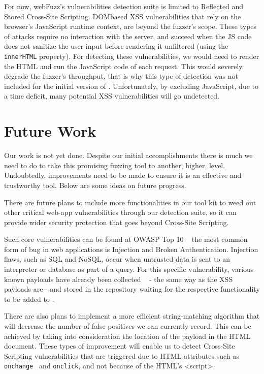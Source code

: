 For now, webFuzz's vulnerabilities detection suite is limited to Reflected and Stored Cross-Site Scripting. DOMbased XSS vulnerabilities that rely on the browser's JavaScript runtime context, are beyond the fuzzer's scope. These types of attacks require no interaction with
the server, and succeed when the JS code does not sanitize the user input before rendering it unfiltered (\eg using the {\tt innerHTML} property). For detecting these vulnerabilities, we would need to render the HTML and run the JavaScript code of each request. This would severely degrade the fuzzer's throughput, that is why this type of detection was not included for the initial version of \pname{}.  Unfortunately, by excluding JavaScript, due to a time deficit, many potential XSS vulnerabilities will go undetected.

\section{Future Work}
Our work is not yet done. Despite our initial accomplishments there is much we need to do to take this promising fuzzing tool to another, higher, level. Undoubtedly, improvements need to be made to ensure it is an effective and trustworthy tool. Below are some ideas on future progress.

There are future plans to include more functionalities in our tool kit to weed out other critical web-app vulnerabilities through our detection suite, so it can provide wider security protection that goes beyond Cross-Site Scripting. 

Such core vulnerabilities can be found at OWASP Top 10 ~\cite{owasp2017} the most common form of bug in web applications is Injection and Broken Authentication. Injection flaws, such as SQL and NoSQL, occur when untrusted data is sent to an interpreter or database as part of a query. For this specific vulnerability, various known payloads have already been collected ~\cite{seclist} - the same way as the XSS payloads are - and stored in the repository waiting for the respective functionality to be added to \pname{}.

There are also plans to implement a more efficient string-matching algorithm that will decrease the number of false positives we can currently record. This can be achieved by taking into consideration the location of the payload in the HTML document. These types of improvement will enable us to detect Cross-Site Scripting vulnerabilities that are triggered due to HTML attributes such as {\tt onchange } and {\tt onclick}, and not because of the HTML's <script>.

